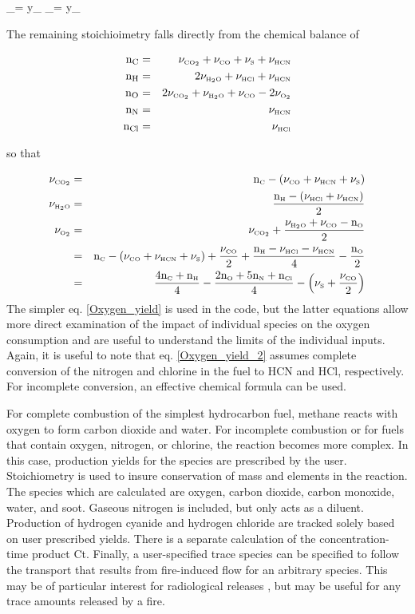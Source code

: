 \be
   \nu_\HCN =  \; y_\HCN \label{HCN_yield}
\ee
\be
   \nu_\HCl =  \; y_\HCl \label{HCl_yield}
\ee

The remaining stoichioimetry falls directly from the chemical balance of

\begin{eqnarray}
\mathrm{n_C} &=& \nu_{\tiny \hbox{CO}_2} + \nu_{\tiny \hbox{CO}} + \nu_{\tiny \hbox{S}} + \nu_{\tiny \hbox{HCN}} \\
\mathrm{n_H} &=& 2 \nu_{\tiny \hbox{H}_2\hbox{O}} + \nu_{\tiny \hbox{HCl}} + \nu_{\tiny \hbox{HCN}} \\
\mathrm{n_O} &=& 2 \nu_{\tiny \hbox{CO}_2} + \nu_{\tiny \hbox{H}_2\hbox{O}} + \nu_{\tiny \hbox{CO}} - 2 \nu_{\tiny \hbox{O}_2} \\
\mathrm{n_{N}} &=& \nu_{\tiny \hbox{HCN}} \\
\mathrm{n_{Cl}} &=& \nu_{\tiny \hbox{HCl}}
\end{eqnarray}

so that

\begin{eqnarray}
  \nu_{\tiny \hbox{CO}_2} &=& \mathrm{n_{\tiny \hbox{C}}} - { \left( {\nu_{\tiny \hbox{CO}} + \nu_{\tiny \hbox{HCN}} + \nu_{\tiny \hbox{S}}} \right) } \\
  \nu_{\tiny \hbox{H}_2\hbox{O}} &=& \frac{\mathrm{n_{\tiny \hbox{H}}} - { \left( {\nu_{\tiny \hbox{HCl}} + \nu_{\tiny \hbox{HCN}}} \right) }}{2} \\
 \nu_{\tiny \hbox{O}_2} &=& \nu_{\tiny \hbox{CO}_2} + \frac{\nu_{\tiny \hbox{H}_2\hbox{O}} + \nu_{\tiny \hbox{CO}} - \mathrm{n_{\tiny \hbox{O}}}}{2} \label{Oxygen_yield} \\
 &=& \mathrm{n_{\tiny \hbox{C}}} - { \left( {\nu_{\tiny \hbox{CO}} + \nu_{\tiny \hbox{HCN}} + \nu_{\tiny \hbox{S}}} \right) }+\frac{\nu_{\tiny \hbox{CO}}}{2}+\frac{\mathrm{n_{\tiny \hbox{H}}} - \nu_{\tiny \hbox{HCl}} - \nu_{\tiny \hbox{HCN}}}{4}-\frac{\mathrm{n_{\tiny \hbox{O}}}}{2} \\
 &=& \frac{4 \mathrm{n_{\tiny \hbox{C}}+n_{\tiny \hbox{H}}}}{4}-\frac{\mathrm{2 n_{\tiny \hbox{O}}+5 n_{\tiny \hbox{N}}+n_{\tiny \hbox{Cl}}}}{4}-{ \left( {\nu_{\tiny \hbox{S}}+\frac{\nu_{\tiny \hbox{CO}}}{2}} \right) } \label{Oxygen_yield_2}
\end{eqnarray}
The simpler eq. \ref{Oxygen_yield} is used in the code, but the latter equations allow more direct examination of the impact of individual species on the oxygen consumption and are useful to understand the limits of the individual inputs. Again, it is useful to note that eq. \ref{Oxygen_yield_2} assumes complete conversion of the nitrogen and chlorine in the fuel to HCN and HCl, respectively. For incomplete conversion, an effective chemical formula can be used.

For complete combustion of the simplest hydrocarbon fuel, methane reacts with oxygen to form carbon dioxide and water. For incomplete combustion or for fuels that contain oxygen, nitrogen, or chlorine, the reaction becomes more complex. In this case, production yields for the species are prescribed by the user. Stoichiometry is used to insure conservation of mass and elements in the reaction. The species which are calculated are oxygen, carbon dioxide, carbon monoxide, water, and soot. Gaseous nitrogen is included, but only acts as a diluent. Production of hydrogen cyanide and hydrogen chloride are tracked solely based on user prescribed yields. There is a separate calculation of the concentration-time product Ct. Finally, a user-specified trace species can be specified to follow the transport that results from fire-induced flow for an arbitrary species. This may be of particular interest for radiological releases \cite{Jones:2008}, but may be useful for any trace amounts released by a fire.


